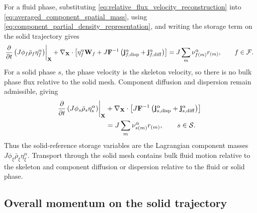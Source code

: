 For a fluid phase, substituting
\eqref{eq:relative_flux_velocity_reconstruction} into
\eqref{eq:averaged_component_spatial_mass}, using
\eqref{eq:component_partial_density_representation}, and writing the storage
term on the solid trajectory gives
%
\begin{equation}
	\left.
	\frac{\partial}{\partial t}
	\left(J\phi_f\bar\rho_f\eta_f^\alpha\right)
	\right\vert_{\mathbf{X}}
	+\nabla_{\mathbf{X}}\cdot
	\left[
	\eta_f^\alpha\mathbf{W}_f
	+
	J\mathbf{F}^{-1}
	\left(
	\mathbf{j}_{f,{\rm disp}}^\alpha
	+
	\mathbf{j}_{f,{\rm diff}}^\alpha
	\right)
	\right]
	=
	J\sum_m\nu_{f (m)}^\alpha r_{(m)},
	\qquad
	f\in\mathcal{F} .
	\label{eq:solid_reference_fluid_component_balance}
\end{equation}
%
For a solid phase \(s\), the phase velocity is the skeleton velocity, so there
is no bulk phase flux relative to the solid mesh.  Component diffusion and
dispersion remain admissible, giving
%
\begin{equation}
	\begin{aligned}
		\left.
		\frac{\partial}{\partial t}
		\left(J\phi_s\bar\rho_s\eta_s^\alpha\right)
		\right\vert_{\mathbf{X}}
		& {}+
		\nabla_{\mathbf{X}}\cdot
		\left[
			J\mathbf{F}^{-1}
			\left(
				\mathbf{j}_{s,{\rm disp}}^\alpha
				+
				\mathbf{j}_{s,{\rm diff}}^\alpha
			\right)
		\right]
		\\
		& {}=
			J\sum_m\nu_{s (m)}^\alpha r_{(m)},
		\qquad
		s\in\mathcal{S} .
	\end{aligned}
	\label{eq:solid_reference_solid_component_balance}
\end{equation}
%
Thus the solid-reference storage variables are the Lagrangian component masses
\(J\phi_\xi\bar\rho_\xi\eta_\xi^\alpha\).  Transport through the solid mesh
contains bulk fluid motion relative to the skeleton and component diffusion or
dispersion relative to the fluid or solid phase.

\subsection{Overall momentum on the solid trajectory}
\label{sec:solid_reference_overall_momentum}

